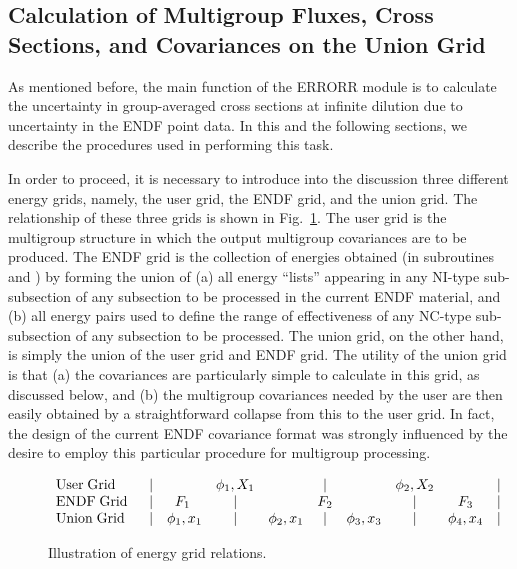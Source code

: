\subsection{Calculation of Multigroup Fluxes, Cross Sections, and
 Covariances on the Union Grid}
\label{ssERRORR_UnionGrid}

As mentioned before, the main function of the ERRORR module is to
calculate the uncertainty in group-averaged cross sections at infinite
dilution due to uncertainty in the ENDF point data.  In this and the
following sections, we describe the procedures used in performing this
task.

In order to proceed, it is necessary to introduce into the discussion
three different energy grids, namely, the user grid, the ENDF grid, and
the union grid.  The relationship of these three grids is shown in
Fig.~\ref{grel}.  The user grid is the multigroup structure in which
the output multigroup covariances are to be produced.  The ENDF grid
is the collection of energies obtained (in subroutines
 and
) by forming
the union of (a) all energy ``lists'' appearing in any NI-type
sub-subsection of any subsection to be processed in the current ENDF
material, and (b) all energy pairs used to define the range of
effectiveness of any NC-type sub-subsection of any subsection to be
processed.  The union grid, on the other hand, is simply the union of
the user grid and ENDF grid.  The utility of the union grid is that (a)
the covariances are particularly simple to calculate in this grid, as
discussed below, and (b) the multigroup covariances needed by the user
are then easily obtained by a straightforward collapse from this to
the user grid.  In fact, the design of the current ENDF covariance
format was strongly influenced by the desire to employ this particular
procedure for multigroup processing\cite{Weisbin,Smith}.

\begin{figure}[b]\centering
$\begin{array}{lccccccccr}
{\rm User\; Grid} \; \;  &|&& \phi_1 , X_1  &  &|& & \phi_2 , X_2   &   &| \\
{\rm ENDF\; Grid} \; \;  &|& F_1 \; &|& &  F_2 & & |&  F_3               &| \\
{\rm Union \;Grid}  \; \;  &|&\phi_1 , x_1 &|& \phi_2 , x_1 &|&\phi_3 ,
   x_3 & | &\phi_4, x_4 &|\\
\end{array}$
\vspace{.25 in}
\caption{Illustration of energy grid relations.}
\label{grel}
\end{figure}

